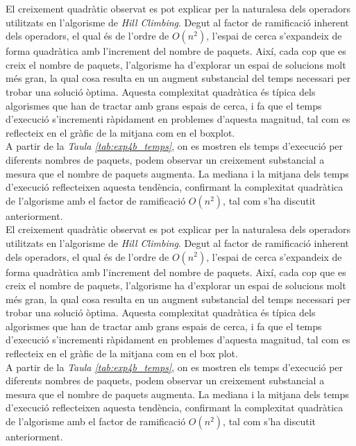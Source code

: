 \documentclass[a4paper]{article}
\begin{document}
	El creixement quadràtic observat es pot explicar per la naturalesa dels operadors utilitzats en l'algorisme de \textit{Hill Climbing}. Degut al factor de ramificació inherent dels operadors, el qual és de l'ordre de $O(n^2)$, l'espai de cerca s'expandeix de forma quadràtica amb l'increment del nombre de paquets. Així, cada cop que es creix el nombre de paquets, l'algorisme ha d'explorar un espai de solucions molt més gran, la qual cosa resulta en un augment substancial del temps necessari per trobar una solució òptima. Aquesta complexitat quadràtica és típica dels algorismes que han de tractar amb grans espais de cerca, i fa que el temps d'execució s'incrementi ràpidament en problemes d'aquesta magnitud, tal com es reflecteix en el gràfic de la mitjana com en el boxplot.\\
	A partir de la \textit{Taula \ref{tab:exp4b_temps}}, on es mostren els temps d'execució per diferents nombres de paquets, podem observar un creixement substancial a mesura que el nombre de paquets augmenta. La mediana i la mitjana dels temps d'execució reflecteixen aquesta tendència, confirmant la complexitat quadràtica de l'algorisme amb el factor de ramificació $O(n^2)$, tal com s'ha discutit anteriorment.\\
	El creixement quadràtic observat es pot explicar per la naturalesa dels operadors utilitzats en l'algorisme de \textit{Hill Climbing}. Degut al factor de ramificació inherent dels operadors, el qual és de l'ordre de $O(n^2)$, l'espai de cerca s'expandeix de forma quadràtica amb l'increment del nombre de paquets. Així, cada cop que es creix el nombre de paquets, l'algorisme ha d'explorar un espai de solucions molt més gran, la qual cosa resulta en un augment substancial del temps necessari per trobar una solució òptima. Aquesta complexitat quadràtica és típica dels algorismes que han de tractar amb grans espais de cerca, i fa que el temps d'execució s'incrementi ràpidament en problemes d'aquesta magnitud, tal com es reflecteix en el gràfic de la mitjana com en el box plot. \\
	
	A partir de la \textit{Taula \ref{tab:exp4b_temps}}, on es mostren els temps d'execució per diferents nombres de paquets, podem observar un creixement substancial a mesura que el nombre de paquets augmenta. La mediana i la mitjana dels temps d'execució reflecteixen aquesta tendència, confirmant la complexitat quadràtica de l'algorisme amb el factor de ramificació $O(n^2)$, tal com s'ha discutit anteriorment. \\
	
\end{document}
